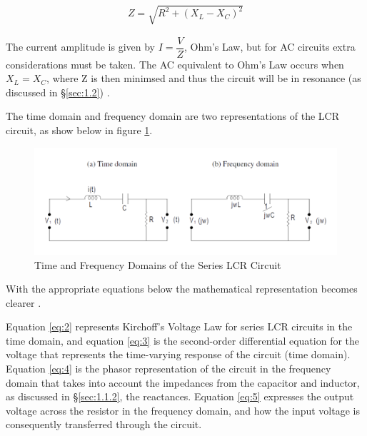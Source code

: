 \documentclass[12pt]{article}
\begin{document}
\begin{gather} \label{eq:1}
    Z = \sqrt{R^2 + (X_L - X_C)^2}
\end{gather}

The current amplitude is given by $I = \dfrac{V}{Z}$, Ohm's Law, but for AC circuits extra considerations must be taken.
The AC equivalent to Ohm's Law occurs when $X_L = X_C$, where Z is then minimsed and thus the circuit will be in resonance (as discussed in §\ref{sec:1.2})
\cite{UCD}.

The time domain and frequency domain are two representations of the LCR circuit, as show below in figure \ref{fig:timefreq}.

\begin{figure} [ht]
    \centering
    \includegraphics[width=\textwidth]{time and freq domains.png}
    \caption{\centering Time and Frequency Domains of the Series LCR Circuit \protect\cite{UCD}}
    \label{fig:timefreq}
\end{figure}

With the appropriate equations below the mathematical representation becomes clearer
\cite{UCD}.

Equation \ref{eq:2} represents Kirchoff's Voltage Law for series LCR circuits in the time domain, and equation \ref{eq:3} is the second-order differential equation
for the voltage that represents the time-varying response of the circuit (time domain).
Equation \ref{eq:4} is the phasor representation of the circuit in the frequency domain that takes into account the impedances from the capacitor and inductor,
as discussed in §\ref{sec:1.1.2}, the reactances. Equation \ref{eq:5} expresses the output voltage across the resistor in the frequency domain, and how the input voltage is
consequently transferred through the circuit.
\end{document}
